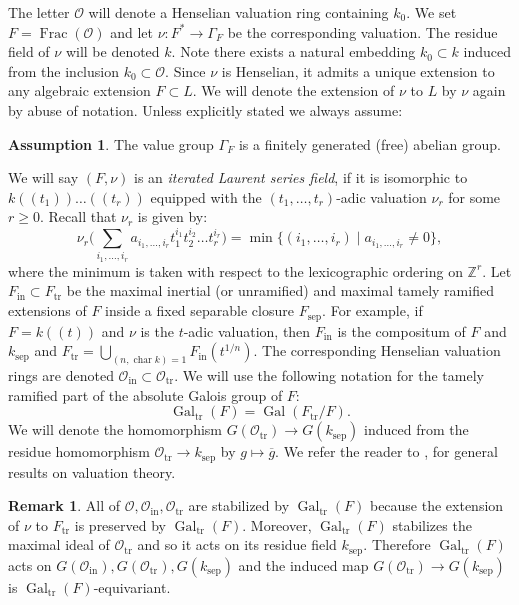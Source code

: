 \documentclass[12pt]{amsart}
\numberwithin{equation}{section}
\theoremstyle{definition}
\newtheorem{remark}[theorem]{Remark}
\newtheorem{assumption}[theorem]{Assumption}
\newcommand{\cO}{\mathcal{O}}
\newcommand{\bZ}{\mathbb{Z}}
\newcommand{\Gal}{\operatorname{Gal}}
\newcommand{\sep}{\operatorname{sep}}
\newcommand{\Char}{\operatorname{char}}
\newcommand{\tr}{\operatorname{tr}}
\newcommand{\Otr}{\cO_{\tr}}
\newcommand{\ksep}{k_{\sep}}
\newcommand{\Ftr}{F_{\tr}}
\newcommand{\oin}{\operatorname{in}}
\newcommand{\Oin}{\cO_{\oin}}
\newcommand{\Fin}{F_{\oin}}
\newcommand{\Fsep}{F_{\sep}}
\newcommand{\Galtr}{\Gal_{\tr}}
\newcommand{\Frac}{\operatorname{Frac}}
\begin{document}
The letter $\cO$ will denote a Henselian valuation ring containing $k_0$. We set $F =\Frac(\cO)$ and let $\nu: F^*\to \Gamma_F$ be the corresponding valuation. The residue field of $\nu$  will be denoted $k$. Note there exists a natural embedding $k_0\subset k$ induced from the inclusion $k_0\subset \cO$. Since $\nu$ is Henselian, it admits a unique extension to any algebraic extension $F\subset L$. We will denote the extension of $\nu$ to $L$ by $\nu$ again by abuse of notation. Unless explicitly stated we always assume:
\begin{assumption}\label{ass.finite_rank}
    The value group $\Gamma_F$ is a finitely generated (free) abelian group.
\end{assumption}
We will say $(F,\nu)$ is an \emph{iterated Laurent series field}, if it is isomorphic to $k(\!(t_1)\!)\dots(\!(t_r)\!)$ equipped with the $(t_1,\dots,t_r)$-adic valuation $\nu_r$ for some $r\geq 0$. Recall that $\nu_r$ is given by:
\begin{equation}\label{e.def_of_t-adic_val}
    \nu_r\big(\sum_{i_1,\dots,i_r}a_{i_1,\dots,i_r}t_1^{i_1}t_2^{i_2}\dots t_{r}^{i_r} \big) = \min\big\{ (i_1,\dots,i_r) \mid a_{i_1,\dots,i_r} \neq 0 \big\},
\end{equation}
where the minimum is taken with respect to the lexicographic ordering on $\bZ^r$.
Let  $F_{\oin} \subset \Ftr$ be the maximal inertial (or unramified) and maximal tamely ramified extensions of $F$ inside a fixed separable closure $\Fsep$.    For example, if $F = k(\!(t)\!)$ and $\nu$ is the $t$-adic valuation, then  $\Fin$ is the compositum of $F$ and $\ksep$ and   $\Ftr = \underset{(n,\Char k)=1}{\bigcup} \Fin(t^{1/n})$. The corresponding Henselian valuation rings are denoted $\Oin\subset \Otr$. We will use the following notation for the tamely ramified part of the absolute Galois group of $F$:
$$\Galtr(F) = \Gal(\Ftr/F).$$
We will denote the homomorphism $G(\Otr)\to G(\ksep)$ induced from the residue homomorphism $\Otr\to \ksep$  by $g\mapsto \overline{g}$. We refer the reader to  \cite{efrat2006valuations}, \cite[Appendix A]{tignol2015value} for general results on valuation theory.

\begin{remark}\label{rem.equivariance}
    All of $\cO,\Oin,\Otr$ are stabilized by $\Galtr(F)$ because the extension of $\nu$ to $\Ftr$ is preserved by $\Galtr(F)$.  Moreover, $\Galtr(F)$ stabilizes the maximal ideal of $\Otr$ and so it acts on its residue field $\ksep$. Therefore $\Galtr(F)$ acts on $G(\Oin),G(\Otr),G(\ksep)$ and the induced map $G(\Otr)\to G(\ksep)$ is $\Galtr(F)$-equivariant.
\end{remark}
\end{document}
